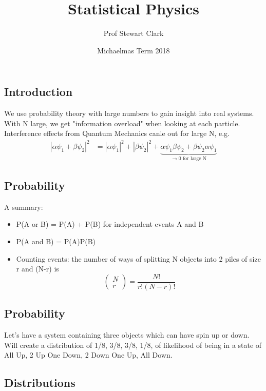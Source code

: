 \documentclass[a4paper, 11pt, normalem]{report}
\title{Statistical Physics \vspace{-20pt}}
\author{Prof Stewart Clark}
\date{\vspace{-15pt}Michaelmas Term 2018}
\begin{document}
\maketitle
\tableofcontents

\chapter{}
\section{Introduction}
We use probability theory with large numbers to gain insight into real systems.
With N large, we get "information overload" when looking at each particle.
Interference effects from Quantum Mechanics canle out for large N, e.g.
\begin{align}
    |\alpha\psi_1 + \beta\psi_2|^2 &= |\alpha\psi_1|^2 + |\beta\psi_2|^2 + \underbrace{\alpha\psi_1\beta\psi_2 + \beta\psi_2\alpha\psi_1}_{\to 0 \text{ for large N}}
\end{align}

\section{Probability}
A summary:
\begin{itemize}
    \item P(A or B) = P(A) + P(B) for independent events A and B
    \item P(A and B) = P(A)P(B)
    \item Counting events: the number of ways of splitting N objects into 2 piles of size r and (N-r) is
        \begin{equation}
            \begin{pmatrix} N \\ r \end{pmatrix} = \frac{N!}{r!(N-r)!}
        \end{equation}
\end{itemize}

\section{Probability}
Let's have a system containing three objects which can have spin up or down.
Will create a distribution of 1/8, 3/8, 3/8, 1/8, of likelihood of being in a state of All Up, 2 Up One Down, 2 Down One Up, All Down.

\section{Distributions}
\end{document}
